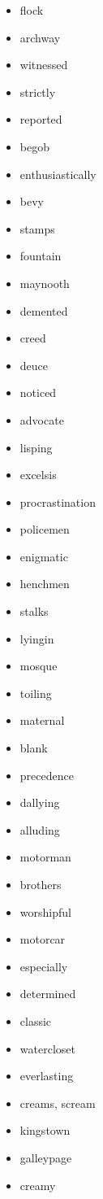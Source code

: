 \documentclass{article}
\begin{document}
\begin{itemize}
    \item flock
    \item archway
    \item witnessed
    \item strictly
    \item reported
    \item begob
    \item enthusiastically
    \item bevy
    \item stamps
    \item fountain
    \item maynooth
    \item demented
    \item creed
    \item deuce
    \item noticed
    \item advocate
    \item lisping
    \item excelsis
    \item procrastination
    \item policemen
    \item enigmatic
    \item henchmen
    \item stalks
    \item lyingin
    \item mosque
    \item toiling
    \item maternal
    \item blank
    \item precedence
    \item dallying
    \item alluding
    \item motorman
    \item brothers
    \item worshipful
    \item motorcar
    \item especially
    \item determined
    \item classic
    \item watercloset
    \item everlasting
    \item creams, scream
    \item kingstown
    \item galleypage
    \item creamy

\end{itemize}
\end{document}
